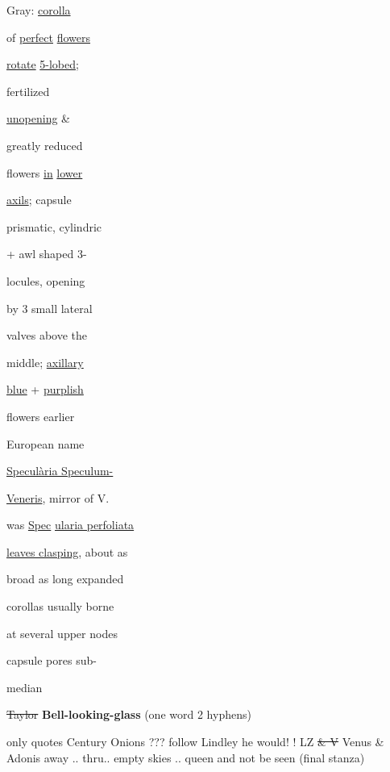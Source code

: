 \documentclass[a4paper]{article}
\begin{document}
\color{blue}
\begin{minipage}[t]{0.3\textwidth}
\setul{}{2pt}
Gray: \ul{corolla}\par
of \ul{perfect} \ul{flowers}\par
\ul{rotate} \ul{5-lobed};\par
fertilized\par
\ul{unopening} \&\par
greatly reduced\par
flowers \ul{in} \ul{lower}\par
\ul{axils}; capsule\par
prismatic, cylindric\par
+ awl shaped 3-\par
locules, opening\par
by 3 small lateral\par
valves above the\par
middle; \ul{axillary}\par
\ul{blue} + \ul{purplish}\par %
flowers earlier\par
European name\par
\setul{}{1pt}
\ul{Specul\`aria Speculum-}\par
\ul{Veneris}, mirror of V.\par
\setul{}{2pt}
was \ul{Spec}
\setul{}{1pt}
\ul{ularia perfoliata}\par
\setul{}{2pt}
\ul{leaves clasping}, about as\par
broad as long expanded\par
corollas usually borne\par
at several upper nodes\par
capsule pores sub-\par
median\par

\sout{Taylor}
\color{red}
\textbf{Bell-looking-glass}
(one word
2 hyphens)

only
quotes Century
Onions ???
\color{blue}
follow Lindley
he would!
! LZ
\sout{\& V}
Venus \& Adonis
away .. thru..
empty skies .. queen
and not be seen
(final stanza)
\end{minipage}
\hspace{1cm}
\end{document}
